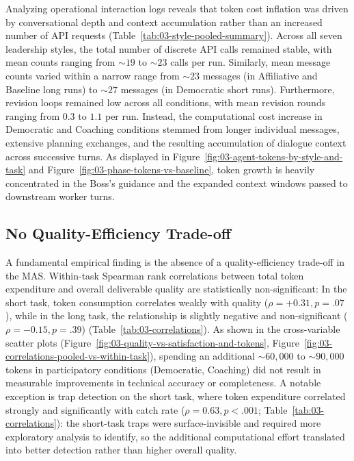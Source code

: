 Analyzing operational interaction logs reveals that token cost inflation was driven by conversational depth and context accumulation rather than an increased number of \ac{API} requests (Table~\ref{tab:03-style-pooled-summary}).
Across all seven leadership styles, the total number of discrete \ac{API} calls remained stable, with mean counts ranging from $\sim19$ to $\sim23$ calls per run.
Similarly, mean message counts varied within a narrow range from $\sim23$ messages (in Affiliative and Baseline long runs) to $\sim27$ messages (in Democratic short runs).
Furthermore, revision loops remained low across all conditions, with mean revision rounds ranging from $0.3$ to $1.1$ per run.
Instead, the computational cost increase in Democratic and Coaching conditions stemmed from longer individual messages, extensive planning exchanges, and the resulting accumulation of dialogue context across successive turns.
As displayed in Figure~\ref{fig:03-agent-tokens-by-style-and-task} and Figure~\ref{fig:03-phase-tokens-vs-baseline}, token growth is heavily concentrated in the Boss's guidance and the expanded context windows passed to downstream worker turns.

\subsection{No Quality-Efficiency Trade-off}
\label{subsec:no-quality-efficiency-tradeoff}

A fundamental empirical finding is the absence of a quality-efficiency trade-off in the \ac{MAS}.
Within-task Spearman rank correlations between total token expenditure and overall deliverable quality are statistically non-significant:
In the short task, token consumption correlates weakly with quality ($\rho = +0.31, p = .07$),
while in the long task, the relationship is slightly negative and non-significant ($\rho = -0.15, p = .39$) (Table~\ref{tab:03-correlations}).
As shown in the cross-variable scatter plots (Figure~\ref{fig:03-quality-vs-satisfaction-and-tokens}, Figure~\ref{fig:03-correlations-pooled-vs-within-task}), spending an additional $\sim60{,}000$ to $\sim90{,}000$ tokens in participatory conditions (Democratic, Coaching) did not result in measurable improvements in technical accuracy or completeness.
A notable exception is trap detection on the short task, where token expenditure correlated strongly and significantly with catch rate ($\rho = 0.63, p < .001$; Table~\ref{tab:03-correlations}): the short-task traps were surface-invisible and required more exploratory analysis to identify, so the additional computational effort translated into better detection rather than higher overall quality.

